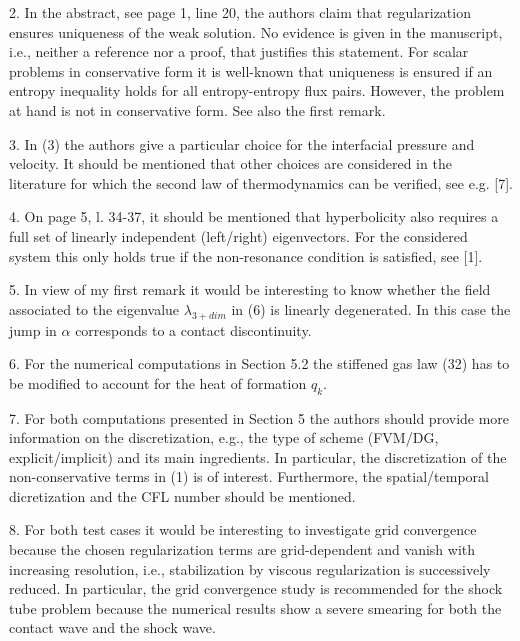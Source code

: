 \documentclass{article}
\begin{document}
\bigskip


{\color{blue}
2. In the abstract, see page 1, line 20, the authors claim that regularization ensures
uniqueness of the weak solution. No evidence is given in the manuscript, i.e., neither
a reference nor a proof, that justifies this statement. For scalar problems in 
conservative form it is well-known that uniqueness is ensured if an entropy inequality
holds for all entropy-entropy flux pairs. However, the problem at hand is not in
conservative form. See also the first remark.}

\bigskip


{\color{blue}
3. In (3) the authors give a particular choice for the interfacial pressure and velocity.
It should be mentioned that other choices are considered in the literature for which
the second law of thermodynamics can be verified, see e.g. [7].}

\bigskip


{\color{blue}
4. On page 5, l. 34-37, it should be mentioned that hyperbolicity also requires a full
set of linearly independent (left/right) eigenvectors. For the considered system this
only holds true if the non-resonance condition is satisfied, see [1].
}

\bigskip


{\color{blue}
5. In view of my first remark it would be interesting to know whether the field associated
to the eigenvalue $\lambda_{3+dim}$ in (6) is linearly degenerated. In this case the jump in $\alpha$
corresponds to a contact discontinuity.
}

\bigskip


{\color{blue}
6. For the numerical computations in Section 5.2 the stiffened gas law (32) has to be
modified to account for the heat of formation $q_k$.}

\bigskip


{\color{blue}
7. For both computations presented in Section 5 the authors should provide more 
information on the discretization, e.g., the type of scheme (FVM/DG, explicit/implicit)
and its main ingredients. In particular, the discretization of the non-conservative
terms in (1) is of interest. Furthermore, the spatial/temporal dicretization and the
CFL number should be mentioned.}

\bigskip


{\color{blue}
8. For both test cases it would be interesting to investigate grid convergence because the
chosen regularization terms are grid-dependent and vanish with increasing resolution,
i.e., stabilization by viscous regularization is successively reduced. In particular, the
grid convergence study is recommended for the shock tube problem because the
numerical results show a severe smearing for both the contact wave and the shock
wave.}
\end{document}
